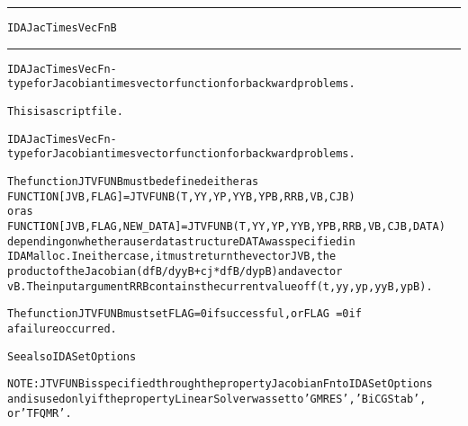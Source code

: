 \begin{samepage}
\hrule
\begin{center}
{\large \verb!IDAJacTimesVecFnB!}
\label{p:IDAJacTimesVecFnB}
\end{center}
\hrule\vspace{0.1in}



\begin{alltt}
IDAJacTimesVecFn - type for Jacobian times vector function for backward problems.
\end{alltt}

\end{samepage}



\begin{samepage}


\begin{alltt}
This is a script file. 
\end{alltt}

\end{samepage}



\begin{alltt}
IDAJacTimesVecFn - type for Jacobian times vector function for backward problems.

   The function JTVFUNB must be defined either as
        FUNCTION [JVB,FLAG] = JTVFUNB(T,YY,YP,YYB,YPB,RRB,VB,CJB)
   or as
        FUNCTION [JVB,FLAG,NEW_DATA] = JTVFUNB(T,YY,YP,YYB,YPB,RRB,VB,CJB,DATA)
   depending on whether a user data structure DATA was specified in
   IDAMalloc. In either case, it must return the vector JVB, the
   product of the Jacobian (dfB/dyyB + cj * dfB/dypB) and a vector
   vB. The input argument RRB contains the current value of f(t,yy,yp,yyB,ypB).

   The function JTVFUNB must set FLAG=0 if successful, or FLAG~=0 if
   a failure occurred.

   See also IDASetOptions

   NOTE: JTVFUNB is specified through the property JacobianFn to IDASetOptions
   and is used only if the property LinearSolver was set to 'GMRES', 'BiCGStab',
   or 'TFQMR'.
\end{alltt}






\vspace{0.1in}